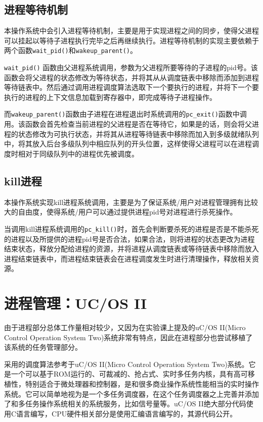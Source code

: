 \subsection{进程等待机制}

本操作系统中会引入进程等待机制，主要是用于实现进程之间的同步，使得父进程可以挂起以等待子进程执行完毕之后再继续执行。进程等待机制的实现主要依赖于两个函数\texttt{wait\_pid()}和\texttt{wakeup\_parent()}。

\texttt{wait\_pid()} 函数由父进程系统调用，参数为父进程所要等待的子进程的pid号。该函数会将父进程的状态修改为等待状态，并将其从从调度链表中移除而添加到进程等待链表中。然后通过调用进程调度算法选取下一个要执行的进程，并将下一个要执行的进程的上下文信息加载到寄存器中，即完成等待子进程操作。

而\texttt{wakeup\_parent()}函数由子进程在进程退出时系统调用的\texttt{pc\_exit()}函数中调用。该函数会首先检查当前进程的父进程是否在等待它，如果是的话，则会将父进程的状态修改为可执行状态，并将其从进程等待链表中移除而加入到多级就绪队列中，将其放入后台多级队列中相应队列的开头位置，这样使得父进程可以在进程调度时相对于同级队列中的进程优先被调度。

\subsection{kill进程}

本操作系统实现kill进程系统调用，主要是为了保证系统/用户对进程管理拥有比较大的自由度，使得系统/用户可以通过提供进程pid号对进程进行杀死操作。

当调用kill进程系统调用的\texttt{pc\_kill()}时，首先会判断要杀死的进程是否是不能杀死的进程以及所提供的进程pid号是否合法，如果合法，则将进程的状态更改为进程结束状态，释放分配给进程的资源，并将进程从调度链表或等待链表中移除而放入进程结束链表中，而进程结束链表会在进程调度发生时进行清理操作，释放相关资源。

\section{进程管理：UC/OS II}

由于进程部分总体工作量相对较少，又因为在实验课上提及的uC/OS II(Micro Control Operation System Two)系统非常有特点，因此在进程部分也尝试移植了该系统的任务管理部分。

采用的调度算法参考于uC/OS II(Micro Control Operation System Two)系统。它是一个可以基于ROM运行的、可裁减的、抢占式、实时多任务内核，具有高可移植性，特别适合于微处理器和控制器，是和很多商业操作系统性能相当的实时操作系统。它可以简单地视为是一个多任务调度器，在这个任务调度器之上完善并添加了和多任务操作系统相关的系统服务，比如信号量等。uC/OS II绝大部分代码使用C语言编写，CPU硬件相关部分是使用汇编语言编写的，其源代码公开。


